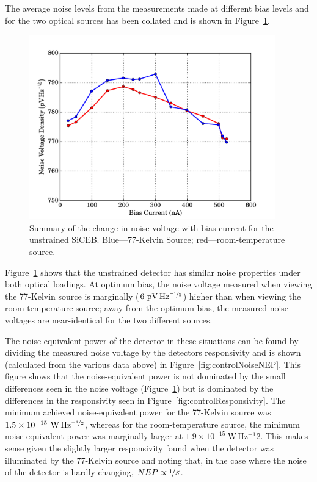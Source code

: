 \par 
The average noise levels from the measurements made at different bias levels and for the two optical sources has been collated and is shown in
Figure~\ref{fig:controlNoiseV}.
\begin{figure}[tb]
\begin{center}
\includegraphics[width = 0.95\textwidth]{figures/control_noiseVoltage}
\caption[Summary of the change in noise voltage with bias current for the unstrained SiCEB]{Summary of the change in noise voltage with bias current for the unstrained SiCEB. Blue---77-Kelvin Source; red---room-temperature source.}
\label{fig:controlNoiseV}
\end{center}
\end{figure}
\par 
Figure~\ref{fig:controlNoiseV} shows that the unstrained detector has similar noise properties under both optical loadings. At optimum bias, the noise voltage measured when viewing the 77-Kelvin source is marginally ($6~\mathrm{pV\,Hz^{\nicefrac{-1}{2}}}$) higher than when viewing the room-temperature source; away from the optimum bias, the measured noise voltages are near-identical for the two different sources.
\par 
The noise-equivalent power of the detector in these situations can be found by dividing the measured noise voltage by the detectors responsivity and is shown (calculated from the various data above) in Figure~\ref{fig:controlNoiseNEP}. This figure shows that the noise-equivalent power is not dominated by the small differences seen in the noise voltage (Figure~\ref{fig:controlNoiseV}) but is dominated by the differences in the responsivity seen in Figure~\ref{fig:controlResponsivity}. The minimum achieved noise-equivalent power for the 77-Kelvin source was $1.5 \times 10^{-15}~\mathrm{W\,Hz^{\nicefrac{-1}{2}}}$, whereas for the room-temperature source, the minimum noise-equivalent power was marginally larger at $1.9 \times 10^{-15}~\mathrm{W\,Hz^{-1}{2}}$. This makes sense given the slightly larger responsivity found when the detector was illuminated by the 77-Kelvin source and noting that, in the case where the noise of the detector is hardly changing, $NEP \propto \nicefrac{1}{S}$.
